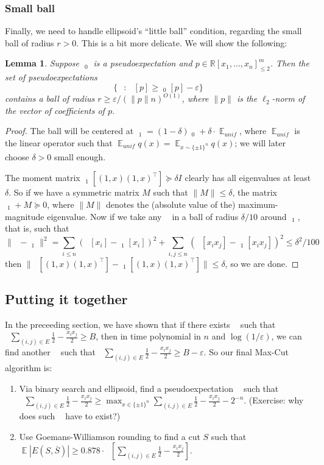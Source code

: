 \documentclass[11pt]{article}
\newtheorem{lemma}[theorem]{Lemma}
\newcommand{\brac}[1]{\left[ #1 \right]}
\newcommand{\R}{\mathbb{R}} %
\renewcommand{\epsilon}{\varepsilon}
\newcommand{\eps}{\epsilon}
\DeclareMathOperator{\E}{\mathbb{E}} %
\DeclareMathOperator{\pE}{\widetilde{\mathbb{E}}} %
\begin{document}
\subsubsection{Small ball}
Finally, we need to handle ellipsoid's ``little ball'' condition, regarding the small ball of radius $r > 0$.
This is a bit more delicate.
We will show the following:
\begin{lemma}
Suppose $\pE_0$ is a pseudoexpectation and $p \in \R[x_1,\ldots,x_n]_{\leq 2}^m$.
Then the set of pseudoexpectations
\[
\{ \pE \, : \, \pE[p] \geq \pE_0[p] - \eps \}
\]
contains a ball of radius $r \geq \eps / (\|p\| n)^{O(1)}$, where $\|p\|$ is the $\ell_2$-norm of the vector of coefficients of $p$.
\end{lemma}
\begin{proof}
The ball will be centered at $\pE_1 = (1 - \delta) \pE_0 + \delta \cdot \E_{unif}$, where $\E_{unif}$ is the linear operator such that $\E_{unif} q(x) = \E_{x \sim \{ \pm 1\}^n} q(x)$; we will later choose $\delta > 0$ small enough.

The moment matrix $\pE_1[(1,x)(1,x)^\top] \succeq \delta I$ clearly has all eigenvalues at least $\delta$.
So if we have a symmetric matrix $M$ such that $\|M\| \leq \delta$, the matrix $\pE_1 + M \succeq 0$, where $\|M\|$ denotes the (absolute value of the) maximum-magnitude eigenvalue.
Now if we take any $\pE$ in a ball of radius $\delta / 10$ around $\pE_1$, that is, such that
\[
\|\pE - \pE_1\|^2 = \sum_{i \leq n} (\pE[x_i] - \pE_1[x_i])^2 + \sum_{i,j \leq n} (\pE[x_i x_j] - \pE_1[x_i x_j])^2 \leq \delta^2/100
\]
then $\| \pE[(1,x)(1,x)^\top] - \pE_1[(1,x)(1,x)^\top] \| \leq \delta$, so we are done.
\end{proof}

\subsection{Putting it together}
In the preceeding section, we have shown that if there exists $\pE$ such that $\pE\sum_{(i,j) \in E} \frac 12 - \frac{x_i x_j}{2} \geq B$, then in time polynomial in $n$ and $\log(1/\varepsilon)$, we can find another $\pE$ such that $\pE\sum_{(i,j) \in E} \frac 12 - \frac{x_i x_j}{2} \geq B - \eps$.
So our final Max-Cut algorithm is:

\begin{enumerate}
\item Via binary search and ellipsoid, find a pseudoexpectation $\pE$ such that $\pE \sum_{(i,j) \in E} \frac 12 - \frac{x_i x_j}{2} \geq \max_{x \in \{ \pm 1\}^n} \sum_{(i,j) \in E} \frac 12 - \frac{x_i x_j}{2} - 2^{-n}$.
(Exercise: why does such $\pE$ have to exist?)
\item Use Goemans-Williamson rounding to find a cut $S$ such that $\E |E(S,\overline{S})| \geq 0.878 \cdot \pE \brac{ \sum_{(i,j) \in E} \frac 12 - \frac{x_i x_j}{2}}$.
\end{enumerate}
\end{document}
